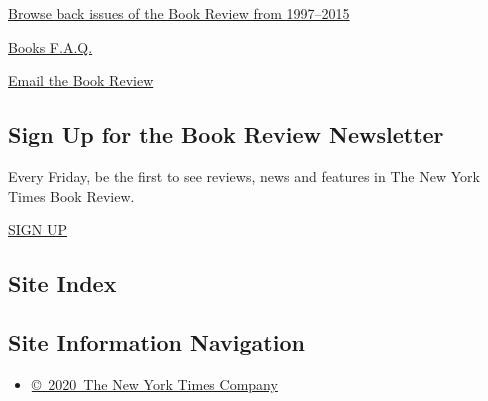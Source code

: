 \href{https://www.nytimes3xbfgragh.onion/2014/07/29/books/review/the-new-york-times-book-review-back-issues.html}{Browse
back issues of the Book Review from 1997--2015}

\href{https://www.nytimes3xbfgragh.onion/membercenter/faq/books.html?ref=review}{Books
F.A.Q.}

\href{mailto:books@NYTimes.com}{Email the Book Review}

\hypertarget{sign-up-for-the-book-review-newsletter}{%
\subsection{Sign Up for the Book Review
Newsletter}\label{sign-up-for-the-book-review-newsletter}}

Every Friday, be the first to see reviews, news and features in The New
York Times Book Review.

\href{/newsletters/signup/BK}{SIGN UP}

\hypertarget{site-index}{%
\subsection{Site Index}\label{site-index}}

\hypertarget{site-information-navigation}{%
\subsection{Site Information
Navigation}\label{site-information-navigation}}

\begin{itemize}
\tightlist
\item
  \href{https://help.nytimes3xbfgragh.onion/hc/en-us/articles/115014792127-Copyright-notice}{©~2020~The
  New York Times Company}
\end{itemize}


